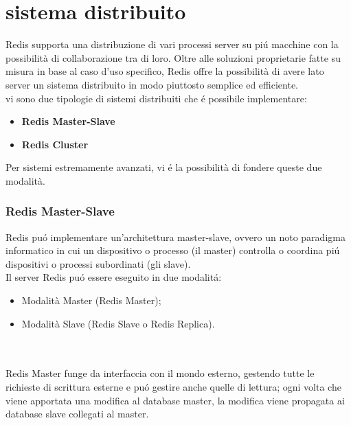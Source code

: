 \section{sistema distribuito}
Redis supporta una distribuzione di vari processi server su piú macchine con la possibilità di collaborazione tra di loro.
Oltre alle soluzioni proprietarie fatte su misura in base al caso d'uso specifico, Redis offre la possibilità di avere lato server un
sistema distribuito in modo piuttosto semplice ed efficiente.\\
vi sono due tipologie di sistemi distribuiti che é possibile implementare:
\begin{itemize}
    \item \textbf{Redis Master-Slave}
    \item \textbf{Redis Cluster}
\end{itemize}
Per sistemi estremamente avanzati, vi é la possibilità di fondere queste due modalità.
\subsubsection{Redis Master-Slave}
Redis puó implementare un'architettura master-slave, ovvero un noto paradigma informatico in cui un dispositivo o processo (il master)
controlla o coordina piú dispositivi o processi subordinati (gli slave).
\\
Il server Redis puó essere eseguito in due modalitá:
\begin{itemize}
    \item Modalità Master (Redis Master);
    \item Modalità Slave (Redis Slave o Redis Replica).
\end{itemize}
\\
\\
Redis Master funge da interfaccia con il mondo esterno, gestendo tutte le richieste di scrittura esterne e puó gestire anche
quelle di lettura;
ogni volta che viene apportata una modifica al database master, la modifica viene propagata ai database slave collegati al master.\\

